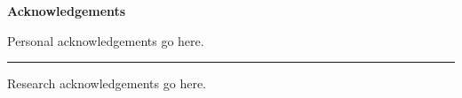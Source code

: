 \vspace*{\fill}

\begin{center}
    \textbf{Acknowledgements}
\end{center}

Personal acknowledgements go here.

\begin{center}
    \rule[1mm]{5cm}{1pt}
\end{center}

Research acknowledgements go here.

\vfill\cleardoublepage{}
